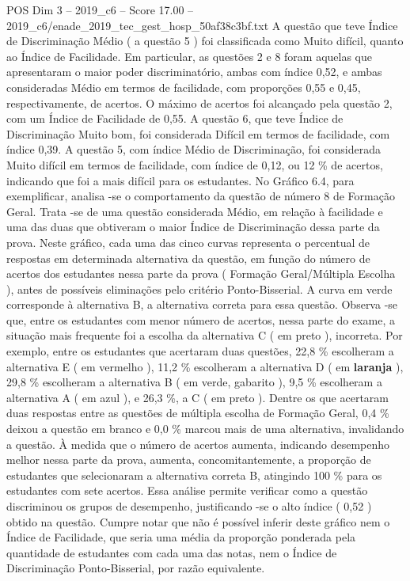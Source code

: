 \begin{textsample}{POS Dim 3 – 2019\_c6 – Score 17.00 – 2019\_c6/enade\_2019\_tec\_gest\_hosp\_50af38c3bf.txt}
A questão que teve Índice de Discriminação Médio ( a questão 5 ) foi classificada como Muito difícil, quanto ao Índice de Facilidade.
Em particular, as questões 2 e 8 foram aquelas que apresentaram o maior poder discriminatório, ambas com índice 0,52, e ambas consideradas Médio em termos de facilidade, com proporções 0,55 e 0,45, respectivamente, de acertos.
O máximo de acertos foi alcançado pela questão 2, com um Índice de Facilidade de 0,55.
A questão 6, que teve Índice de Discriminação Muito bom, foi considerada Difícil em termos de facilidade, com índice 0,39.
A questão 5, com índice Médio de Discriminação, foi considerada Muito difícil em termos de facilidade, com índice de 0,12, ou 12 \% de acertos, indicando que foi a mais difícil para os estudantes.
No Gráfico 6.4, para exemplificar, analisa -se o comportamento da questão de número 8 de Formação Geral.
Trata -se de uma questão considerada Médio, em relação à facilidade e uma das duas que obtiveram o maior Índice de Discriminação dessa parte da prova.
Neste gráfico, cada uma das cinco curvas representa o percentual de respostas em determinada alternativa da questão, em função do número de acertos dos estudantes nessa parte da prova ( Formação Geral/Múltipla Escolha ), antes de possíveis eliminações pelo critério Ponto-Bisserial.
A curva em verde corresponde à alternativa B, a alternativa correta para essa questão.
Observa -se que, entre os estudantes com menor número de acertos, nessa parte do exame, a situação mais frequente foi a escolha da alternativa C ( em preto ), incorreta.
Por exemplo, entre os estudantes que acertaram duas questões, 22,8 \% escolheram a alternativa E ( em vermelho ), 11,2 \% escolheram a alternativa D ( em \textbf{laranja} ), 29,8 \% escolheram a alternativa B ( em verde, gabarito ), 9,5 \% escolheram a alternativa A ( em azul ), e 26,3 \%, a C ( em preto ).
Dentre os que acertaram duas respostas entre as questões de múltipla escolha de Formação Geral, 0,4 \% deixou a questão em branco e 0,0 \% marcou mais de uma alternativa, invalidando a questão.
À medida que o número de acertos aumenta, indicando desempenho melhor nessa parte da prova, aumenta, concomitantemente, a proporção de estudantes que selecionaram a alternativa correta B, atingindo 100 \% para os estudantes com sete acertos.
Essa análise permite verificar como a questão discriminou os grupos de desempenho, justificando -se o alto índice ( 0,52 ) obtido na questão.
Cumpre notar que não é possível inferir deste gráfico nem o Índice de Facilidade, que seria uma média da proporção ponderada pela quantidade de estudantes com cada uma das notas, nem o Índice de Discriminação Ponto-Bisserial, por razão equivalente.

\end{textsample}
